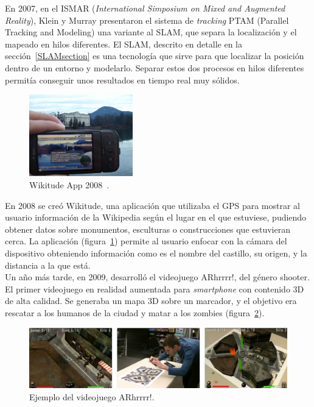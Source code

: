 En 2007, en el ISMAR (\textit{International Simposium on Mixed and Augmented Reality}), Klein y Murray presentaron el sistema de \textit{tracking} PTAM (Parallel Tracking and Modeling) una variante al SLAM, que separa la localización y el mapeado en hilos diferentes. El SLAM, descrito en detalle en la sección~\ref{SLAMsection} es una tecnología que sirve para que localizar la posición dentro de un entorno y modelarlo. Separar estos dos procesos en hilos diferentes permitía conseguir unos resultados en tiempo real muy sólidos.\\

\begin{figure}
    \centering
    \includegraphics[width=0.4\textwidth]{Images/Wikitude_Example.jpeg}
    \caption[Wikitude App 2008]{Wikitude App 2008~\cite{ARToolkit}.}
    \label{fig:wikitude2008}
\end{figure}

En 2008 se creó Wikitude, una aplicación que utilizaba el GPS para mostrar al usuario información de la Wikipedia según el lugar en el que estuviese, pudiendo obtener datos sobre monumentos, esculturas o construcciones que estuvieran cerca. La aplicación (figura~\ref{fig:wikitude2008}) permite al usuario enfocar con la cámara del dispositivo obteniendo información como es el nombre del castillo, su origen, y la distancia a la que está.\\

Un año más tarde, en 2009, desarrolló el videojuego ARhrrrr!, del género shooter. El primer videojuego en realidad aumentada para \textit{smartphone} con contenido 3D de alta calidad. Se generaba un mapa 3D sobre un marcador, y el objetivo era rescatar a los humanos de la ciudad y matar a los zombies (figura~\ref{fig:arhrrrr})\cite{ARToolkit}.

\begin{figure}[H]
    \centering
        \includegraphics[width=\linewidth]{Images/Arrrr.png}
        \caption[Ejemplo del videojuego ARhrrrr!]{Ejemplo del videojuego ARhrrrr!\footnotemark.}
        \label{fig:arhrrrr}
\end{figure}

